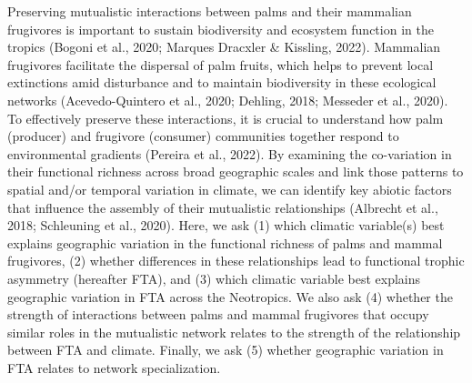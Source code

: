 \documentclass[
]{agujournal2019}
\begin{document}
Preserving mutualistic interactions between palms and their mammalian
frugivores is important to sustain biodiversity and ecosystem function
in the tropics (Bogoni et al., 2020; Marques Dracxler \& Kissling,
2022). Mammalian frugivores facilitate the dispersal of palm fruits,
which helps to prevent local extinctions amid disturbance and to
maintain biodiversity in these ecological networks (Acevedo-Quintero et
al., 2020; Dehling, 2018; Messeder et al., 2020). To effectively
preserve these interactions, it is crucial to understand how palm
(producer) and frugivore (consumer) communities together respond to
environmental gradients (Pereira et al., 2022). By examining the
co-variation in their functional richness across broad geographic scales
and link those patterns to spatial and/or temporal variation in climate,
we can identify key abiotic factors that influence the assembly of their
mutualistic relationships (Albrecht et al., 2018; Schleuning et al.,
2020). Here, we ask (1) which climatic variable(s) best explains
geographic variation in the functional richness of palms and mammal
frugivores, (2) whether differences in these relationships lead to
functional trophic asymmetry (hereafter FTA), and (3) which climatic
variable best explains geographic variation in FTA across the
Neotropics. We also ask (4) whether the strength of interactions between
palms and mammal frugivores that occupy similar roles in the mutualistic
network relates to the strength of the relationship between FTA and
climate. Finally, we ask (5) whether geographic variation in FTA relates
to network specialization.
\end{document}
